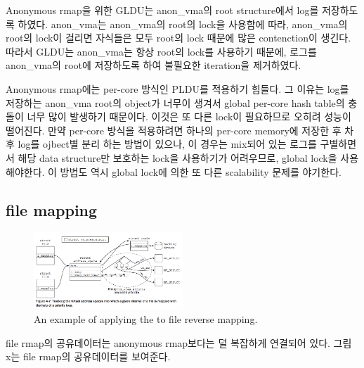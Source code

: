 Anonymous rmap을 위한 GLDU는 anon\_vma의 root structure에서 log를 저장하도록 하였다. 
anon\_vma는 anon\_vma의 root의 lock을 사용함에 따라, anon\_vma의 root의 lock이 걸리면 자식들은
모두 root의 lock 때문에 많은 contenction이 생긴다.
따라서 GLDU는 anon\_vma는 항상 root의 lock를 사용하기 때문에, 로그를 anon\_vma의 root에 저장하도록 하여
불필요한 iteration을 제거하였다. 

Anonymous rmap에는 per-core 방식인 PLDU를 적용하기 힘들다.
그 이유는 log를 저장하는 anon\_vma root의 object가 너무이 생겨서 global per-core hash
table의 충돌이 너무 많이 발생하기 때문이다. 
이것은 또 다른 lock이 필요하므로 오히려 성능이 떨어진다. 
만약 per-core 방식을 적용하려면 하나의 per-core memory에 저장한 후 차후 log를 ojbect별 분리 하는 방법이 있으나, 
이 경우는  mix되어 있는 로그를 구별하면서 해당 data structure만 보호하는 lock을 사용하기가 어려우므로, global
lock을 사용해야한다.
이 방법도 역시 global lock에 의한 또 다른 scalability 문제를 야기한다.

\subsection{file mapping}

\begin{figure}[tb]
  \begin{center}
     \includegraphics[width=0.5\textwidth,height=0.5\textheight,keepaspectratio]{fig/anon_vma_sample}
  \end{center}
  \caption{An example of applying the  to file reverse mapping. }
  \label{fig:deferu}
\end{figure}
file rmap의 공유데이터는 anonymous rmap보다는 덜 복잡하게 연결되어 있다.
그림 x는 file rmap의 공유데이터를 보여준다. 

